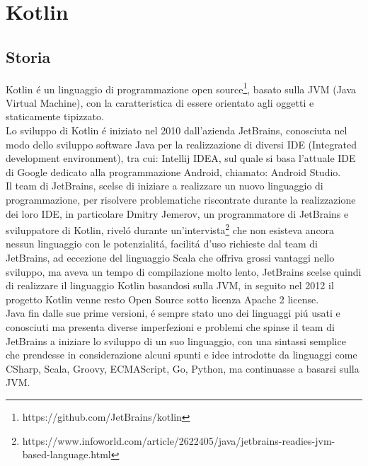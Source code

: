 \chapter{Kotlin}                %
\lhead[\fancyplain{}{\bfseries\thepage}]{\fancyplain{}{\bfseries\rightmark}}
\section{Storia}                 %

Kotlin \'e un linguaggio di programmazione open source\footnote{https://github.com/JetBrains/kotlin}, basato sulla JVM (Java Virtual Machine), con la caratteristica di essere orientato agli oggetti e staticamente tipizzato. \\
Lo sviluppo di Kotlin \'e iniziato nel 2010 dall'azienda JetBrains, conosciuta nel modo dello sviluppo software Java per la realizzazione di diversi IDE (Integrated development environment), tra cui: Intellij IDEA, sul quale si basa l'attuale IDE di Google dedicato alla programmazione Android, chiamato: Android Studio.\\
Il team di JetBrains, scelse di iniziare a realizzare un nuovo linguaggio di programmazione, per risolvere problematiche riscontrate durante la realizzazione dei loro IDE, in particolare Dmitry Jemerov, un programmatore di JetBrains e sviluppatore di Kotlin, rivel\'o durante un'intervista\footnote{https://www.infoworld.com/article/2622405/java/jetbrains-readies-jvm-based-language.html} che non esisteva ancora nessun linguaggio con le potenzialit\'a, facilit\'a d'uso richieste dal team di JetBrains, ad eccezione del linguaggio Scala che offriva grossi vantaggi nello sviluppo, ma aveva un tempo di compilazione molto lento, JetBrains scelse quindi di realizzare il linguaggio Kotlin basandosi sulla JVM, in seguito nel 2012 il progetto Kotlin venne resto Open Source sotto licenza Apache 2 license.\\
Java fin dalle sue prime versioni, \'e sempre stato uno dei linguaggi  pi\'u usati e conosciuti ma presenta diverse imperfezioni e problemi che spinse il team di JetBrains a iniziare lo sviluppo di un suo linguaggio, con una sintassi semplice che prendesse in considerazione alcuni spunti e idee introdotte da linguaggi come CSharp, Scala, Groovy, ECMAScript, Go, Python, ma continuasse a basarsi sulla JVM.\\
